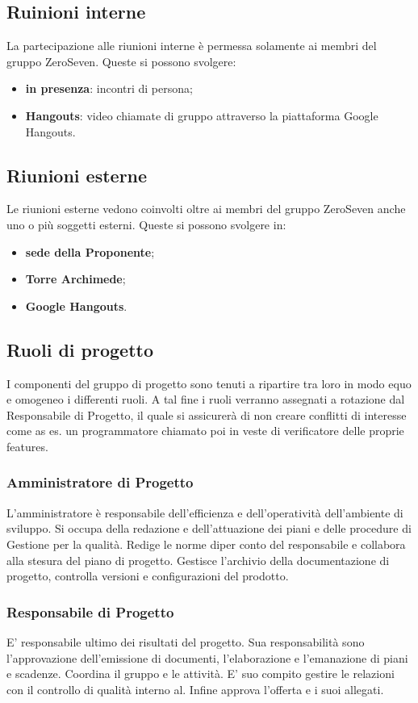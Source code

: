 \subsection{Ruinioni interne}
La partecipazione alle riunioni interne è permessa solamente ai membri del gruppo ZeroSeven. Queste si possono svolgere:
\begin{itemize}
	\item \textbf{in presenza}: incontri di persona;
	\item \textbf{Hangouts}: video chiamate di gruppo attraverso la piattaforma Google Hangouts.
\end{itemize}
\subsection{Riunioni esterne}
Le riunioni esterne vedono coinvolti oltre ai membri del gruppo ZeroSeven anche uno o più soggetti esterni. Queste si possono svolgere  in:
\begin{itemize}
	\item \textbf{sede della Proponente};
	\item \textbf{Torre Archimede};
	\item \textbf{Google Hangouts}.
\end{itemize}
\subsection{Ruoli di progetto}
I componenti del gruppo di progetto sono tenuti a ripartire tra loro in modo equo e omogeneo i differenti ruoli. A tal fine i ruoli verranno assegnati a rotazione dal Responsabile di Progetto, il quale si assicurerà di non creare conflitti di interesse come as es. un programmatore chiamato poi in veste di verificatore delle proprie features.
\subsubsection{Amministratore di Progetto} L'amministratore è responsabile dell'efficienza e dell'operatività dell'ambiente di sviluppo. Si occupa della redazione e dell'attuazione dei piani e delle procedure di Gestione per la qualità. Redige le norme diper conto del responsabile e collabora alla stesura del piano di progetto. Gestisce l'archivio della documentazione di progetto, controlla versioni e configurazioni del prodotto.
\subsubsection{Responsabile di Progetto}E' responsabile ultimo dei risultati del progetto. Sua responsabilità sono l'approvazione dell'emissione di documenti, l'elaborazione e l'emanazione di piani e scadenze. Coordina il gruppo e le attività. E' suo compito gestire le relazioni con il controllo di qualità interno al. Infine approva l'offerta e i suoi allegati.
